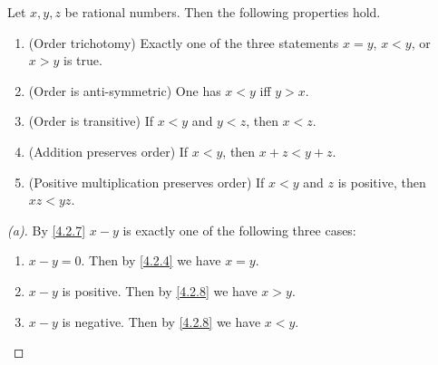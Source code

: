 \begin{prop}\label{4.2.9}
  Let \(x, y, z\) be rational numbers.
  Then the following properties hold.
  \begin{enumerate}
    \item (Order trichotomy)
          Exactly one of the three statements \(x = y\), \(x < y\), or \(x > y\) is true.
    \item (Order is anti-symmetric)
          One has \(x < y\) iff \(y > x\).
    \item (Order is transitive)
          If \(x < y\) and \(y < z\), then \(x < z\).
    \item (Addition preserves order)
          If \(x < y\), then \(x + z < y + z\).
    \item (Positive multiplication preserves order)
          If \(x < y\) and \(z\) is positive, then \(xz < yz\).
  \end{enumerate}
\end{prop}

\begin{proof}[(a)]
  By \cref{4.2.7} \(x - y\) is exactly one of the following three cases:
  \begin{enumerate}[label=(\Roman*)]
    \item \(x - y = 0\).
          Then by \cref{4.2.4} we have \(x = y\).
    \item \(x - y\) is positive.
          Then by \cref{4.2.8} we have \(x > y\).
    \item \(x - y\) is negative.
          Then by \cref{4.2.8} we have \(x < y\).
  \end{enumerate}
\end{proof}

